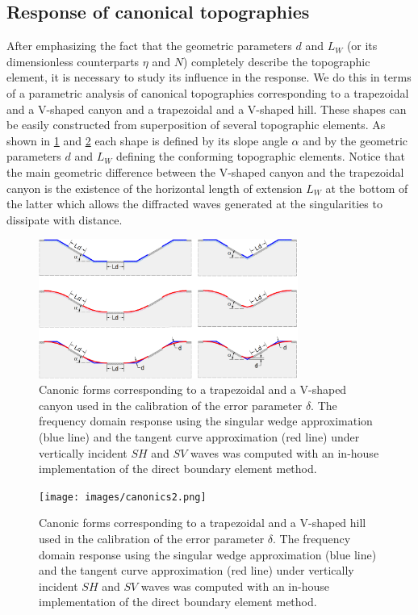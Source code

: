 \documentclass[11pt,letterpaper]{article}
\begin{document}
\subsection*{Response of canonical topographies}

After emphasizing the fact that the geometric parameters $d$ and $L_W$ (or its dimensionless counterparts $\eta$ and $N$) completely describe the topographic element, it is necessary to study its influence in the response. We do this in terms of a parametric analysis of canonical topographies corresponding to a trapezoidal and a V-shaped canyon and a trapezoidal and a V-shaped hill. These shapes can be easily constructed from superposition of several topographic elements. As shown in \cref{fig:canonicos1} and \cref{fig:canonicos2}  each shape is defined by its slope angle $\alpha$ and by the geometric parameters $d$ and $L_W$ defining the conforming topographic elements. Notice that the main geometric difference between the V-shaped canyon and the trapezoidal canyon is the existence of the horizontal length of extension $L_W$ at the bottom of the latter which allows the diffracted waves generated at the singularities to dissipate with distance.

\begin{figure}[H]
\centering
\includegraphics[width=8.5cm]{images/canonics.png}
\caption{\small Canonic forms corresponding to a trapezoidal and a V-shaped canyon used in the calibration of the error parameter $\delta$. The frequency domain response using the singular wedge approximation (blue line) and the tangent curve approximation (red line) under vertically incident $SH$ and $SV$ waves was computed with an in-house implementation of the direct boundary element method.}
\label{fig:canonicos1}
\end{figure}

\begin{figure}[H]
\centering
\texttt{[image: images/canonics2.png]}
\caption{\small Canonic forms corresponding to a trapezoidal and a V-shaped hill used in the calibration of the error parameter $\delta$. The frequency domain response using the singular wedge approximation (blue line) and the tangent curve approximation (red line) under vertically incident $SH$ and $SV$ waves was computed with an in-house implementation of the direct boundary element method.}
\label{fig:canonicos2}
\end{figure}
\end{document}
